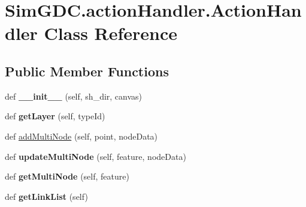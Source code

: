 \hypertarget{class_sim_g_d_c_1_1action_handler_1_1_action_handler}{}\section{Sim\+G\+D\+C.\+action\+Handler.\+Action\+Handler Class Reference}
\label{class_sim_g_d_c_1_1action_handler_1_1_action_handler}
\subsection*{Public Member Functions}
\begin{DoxyCompactItemize}
\item 
\hypertarget{class_sim_g_d_c_1_1action_handler_1_1_action_handler_a7ce2b4e844e5130b34fc2be223cd1c4e}{}def {\bfseries \+\_\+\+\_\+init\+\_\+\+\_\+} (self, sh\+\_\+dir, canvas)\label{class_sim_g_d_c_1_1action_handler_1_1_action_handler_a7ce2b4e844e5130b34fc2be223cd1c4e}

\item 
\hypertarget{class_sim_g_d_c_1_1action_handler_1_1_action_handler_a00eaa01ee706b7bc6c51465847028ccd}{}def {\bfseries get\+Layer} (self, type\+Id)\label{class_sim_g_d_c_1_1action_handler_1_1_action_handler_a00eaa01ee706b7bc6c51465847028ccd}

\item 
def \hyperlink{class_sim_g_d_c_1_1action_handler_1_1_action_handler_af21ca70fa2e6a5358b9fcc8c8d3bc815}{add\+Multi\+Node} (self, point, node\+Data)
\item 
\hypertarget{class_sim_g_d_c_1_1action_handler_1_1_action_handler_abeaa8a461846ae07594a4cd69f7f85f1}{}def {\bfseries update\+Multi\+Node} (self, feature, node\+Data)\label{class_sim_g_d_c_1_1action_handler_1_1_action_handler_abeaa8a461846ae07594a4cd69f7f85f1}

\item 
\hypertarget{class_sim_g_d_c_1_1action_handler_1_1_action_handler_aeaed765d3f77de33bc6e760a7ae243af}{}def {\bfseries get\+Multi\+Node} (self, feature)\label{class_sim_g_d_c_1_1action_handler_1_1_action_handler_aeaed765d3f77de33bc6e760a7ae243af}

\item 
\hypertarget{class_sim_g_d_c_1_1action_handler_1_1_action_handler_a7846493d7f83224b40b3e8ac3ab26130}{}def {\bfseries get\+Link\+List} (self)\label{class_sim_g_d_c_1_1action_handler_1_1_action_handler_a7846493d7f83224b40b3e8ac3ab26130}


\end{DoxyCompactItemize}
